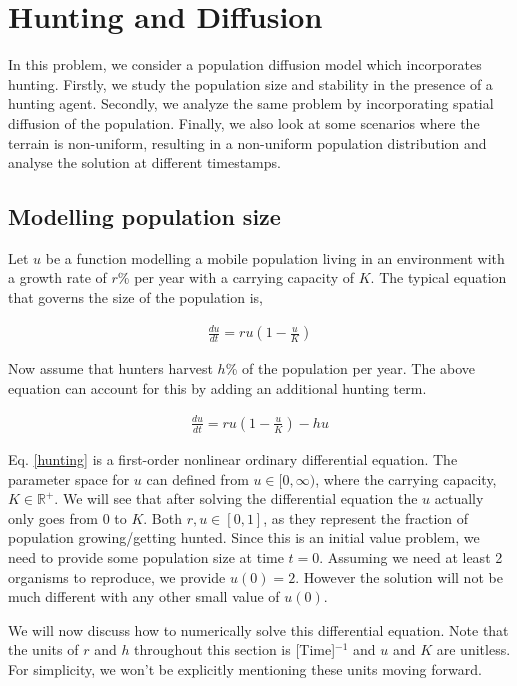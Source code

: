 \section{Hunting and Diffusion}
In this problem, we consider a population diffusion model which incorporates hunting. Firstly, we study the population size and stability in the presence of a hunting agent. Secondly, we analyze the same problem by incorporating spatial diffusion of the population. Finally, we also look at some scenarios where the terrain is non-uniform, resulting in a non-uniform population distribution and analyse the solution at different timestamps.

\subsection{Modelling population size}
Let $u$ be a function modelling a mobile population living in an environment with a growth rate of $r$\% per year with a carrying capacity of $K$. The typical equation that governs the size of the population is,

\begin{align}
    \frac{du}{dt} = ru \left(1 - \frac{u}{K}\right)
\end{align}

Now assume that hunters harvest $h$\% of the population per year. The above equation can account for this by adding an additional hunting term.

\begin{align} \label{hunting}
    \frac{du}{dt} = ru \left(1 - \frac{u}{K}\right) - hu
\end{align}

Eq. \ref{hunting} is a first-order nonlinear ordinary differential equation. The parameter space for $u$ can defined from $u\in [0, \infty)$, where the carrying capacity, $K \in \mathbb{R}^+$. We will see that after solving the differential equation the $u$ actually only goes from $0$ to $K$. Both $r, u \in [0,1]$, as they represent the fraction of population growing/getting hunted. Since this is an initial value problem, we need to provide some population size at time $t=0$. Assuming we need at least 2 organisms to reproduce, we provide $u(0)=2$. However the solution will not be much different with any other small value of $u(0)$.

We will now discuss how to numerically solve this differential equation. Note that the units of $r$ and $h$ throughout this section is [Time]$^{-1}$ and $u$ and $K$ are unitless. For simplicity, we won't be explicitly mentioning these units moving forward.

